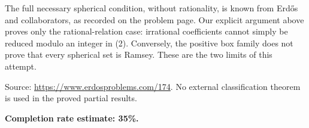 The full necessary spherical condition, without rationality, is known from Erd\H{o}s and collaborators, as recorded on the problem page. Our explicit argument above proves only the rational-relation case: irrational coefficients cannot simply be reduced modulo an integer in (2). Conversely, the positive box family does not prove that every spherical set is Ramsey. These are the two limits of this attempt.

Source: \url{https://www.erdosproblems.com/174}. No external classification theorem is used in the proved partial results.

\textbf{Completion rate estimate: 35\%.}

